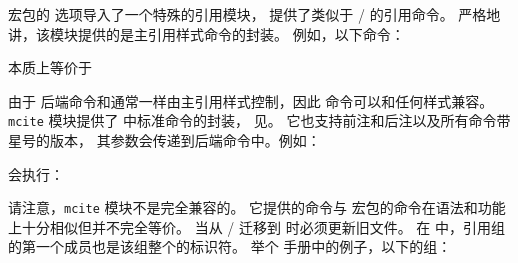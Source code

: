 宏包的  选项导入了一个特殊的引用模块，
提供了类似于 \slash{} 的引用命令。
严格地讲，该模块提供的是主引用样式命令的封装。
例如，以下命令：

\begin{ltxexample}
\end{ltxexample}
%
本质上等价于

\begin{ltxexample}
%
%
\cite{key1,setA,key2,setB}
\end{ltxexample}
%
由于  后端命令和通常一样由主引用样式控制，因此  命令可以和任何样式兼容。
\texttt{mcite} 模块提供了  中标准命令的封装，
见。
它也支持前注和后注以及所有命令带星号的版本，
其参数会传递到后端命令中。例如：

\begin{ltxexample}
\end{ltxexample}
%
会执行：

\begin{ltxexample}
%
\cite*[pre][post]{setA}
\end{ltxexample}
%
请注意，\texttt{mcite} 模块不是完全兼容的。
它提供的命令与  宏包的命令在语法和功能上十分相似但并不完全等价。
当从 \slash{} 迁移到 \biblatex 时必须更新旧文件。
在  中，引用组的第一个成员也是该组整个的标识符。
举个  手册中的例子，以下的组：


